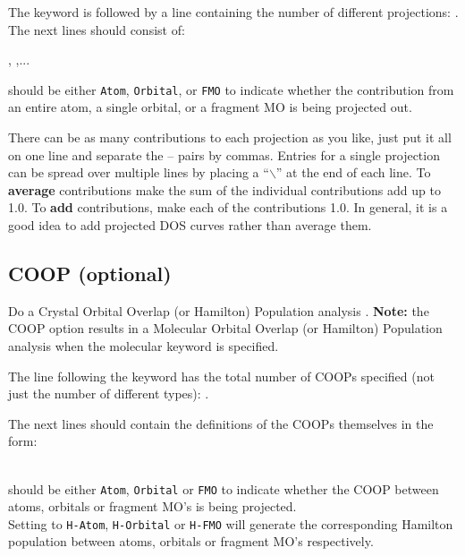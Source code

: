 The keyword is followed by a line containing the number of different
projections: . The next  lines
should consist of:

  , 
,...

 should be either {\tt Atom}, {\tt Orbital}, or {\tt FMO} to indicate
whether the contribution from an entire atom, a single orbital, or a
fragment MO is being projected out.

There can be as many contributions to each projection as
you like, just put it all on one line and separate the
-- pairs by commas.
Entries for a single projection can be spread over multiple lines by placing a ``$\backslash$'' at the end of each line.
To {\bf average} contributions make the sum of the individual
contributions add up to 1.0.  To {\bf add} contributions, make each of
the contributions 1.0.  In general, it is a good idea to add projected
DOS curves rather than average them.

\subsection{{\sf COOP} (optional)}

Do a Crystal Orbital Overlap (or Hamilton) Population analysis \cite{eht2,cohp3,mulliken,coop}. {\bf Note:} the {\sf COOP} option results in a Molecular Orbital Overlap (or Hamilton) Population analysis when the {\sf molecular} keyword is specified.

\noindent The line following the keyword has the total number of COOPs
specified (not just the number of different types): .

\noindent The next  lines should contain the definitions
of the COOPs themselves in the form:

    
  \\

\noindent {} should be either {\tt Atom}, {\tt Orbital} or {\tt FMO} to indicate
whether the COOP between atoms, orbitals or fragment MO's is being projected. \\

\noindent Setting  to {\tt H-Atom}, {\tt H-Orbital} or {\tt H-FMO} will generate the corresponding Hamilton population between atoms, orbitals or fragment MO's respectively. \\

